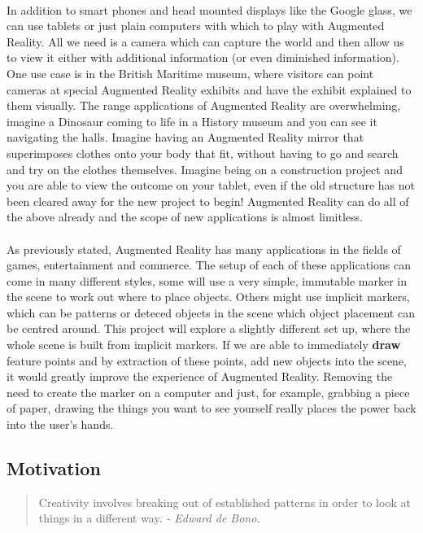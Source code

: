\documentclass[11pt]{article}
\begin{document}
\\
In addition to smart phones and head mounted displays like the Google glass,
we can use tablets or just plain computers with which to play
with Augmented Reality. All we need is a camera which can capture the world and then allow 
us to view it either with additional information (or even diminished 
information). One use case is in the British Maritime museum, where 
visitors can point cameras at special Augmented Reality exhibits 
and have the exhibit explained to them visually. The range applications 
of Augmented Reality are overwhelming, imagine a Dinosaur coming to life in a
History museum and you can see it navigating the halls. Imagine having an
Augmented Reality mirror that superimposes clothes onto your body that fit, 
without having to go and search and try on the clothes themselves. Imagine being on a 
construction project and you are able to view the outcome on your tablet, even
if the old structure has not been cleared away for the new project to begin!
Augmented Reality can do all of the above already and the scope of new
applications is almost limitless.\\ 
\\
As previously stated, Augmented Reality has many applications in the
fields of games, entertainment and commerce. The setup of each of these
applications can come in many different styles, some will use a 
very simple, immutable marker in the scene to work out where to place
objects. Others might use implicit markers, which can be patterns or
deteced objects in the scene which object placement can be centred around. 
This project will explore a slightly different set up, where the whole
scene is built from implicit markers. If we are
able to immediately \textbf{draw} feature points and by extraction of these points, 
add new objects into the scene, it would greatly improve the 
experience of Augmented Reality. Removing the need to create the marker 
on a computer and just, for example, grabbing a piece of paper, drawing 
the things you want to see yourself really places the power back into
the user's hands.

\subsection{Motivation}
\begin{quote}
Creativity involves breaking out of established patterns in
		order to look at things in a different way. \textit{- Edward de Bono.}
\end{quote}
\end{document}
